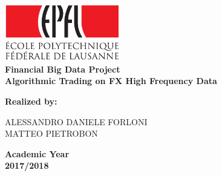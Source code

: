 \documentclass[a4paper]{article}
\begin{document}
	
	


\newcommand*\xbar[1]{%
  \hbox{%
    \vbox{%
      \hrule height 0.5pt %
      \kern0.5ex%
      \hbox{%
        \kern-0.1em%
        \ensuremath{#1}%
        \kern-0.5em%
      }%
    }%
  }%
} 

\begin{titlepage}
	\vspace{50mm}
	\begin{center}
		\includegraphics[width=5cm]{Figures/EPFL_LOG.pdf}\\
		\vspace{2cm}
		\vspace{5mm}
		{\LARGE{\bf Financial Big Data Project}}\\
		\vspace{3mm}
		{\large{\bf Algorithmic Trading on FX High Frequency Data}}\\
	\end{center}
	\vspace{60mm}
	\par
	\noindent

			{\large{\bf Realized by: \\
            
            		\vspace{10pt}
                    
					ALESSANDRO DANIELE FORLONI\\
					MATTEO PIETROBON\\
				}}
	
	\vspace{10pt}
	\begin{center}
		{\large{\bf Academic Year\\
				2017/2018 }}
	\end{center}
\end{titlepage}
\end{document}
